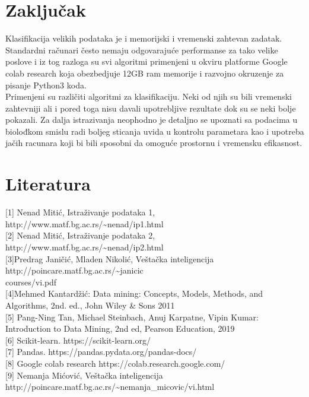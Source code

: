 \documentclass[14pt]{extarticle}
\begin{document}
\section{Zaključak}
\label{sec:naslov1}
Klasifikacija velikih podataka je i memorijski i vremenski zahtevan zadatak. Standardni računari često nemaju odgovarajuće performanse za tako velike poslove i iz tog razloga su svi algoritmi primenjeni u okviru platforme Google colab research koja obezbedjuje 12GB ram memorije i razvojno okruzenje za pisanje Python3 koda.\\ Primenjeni su različiti algoritmi za klasifikaciju. Neki od njih su bili vremenski zahtevniji ali i pored toga nisu davali upotrebljive rezultate dok su se neki bolje pokazali. Za dalja istrazivanja neophodno je detaljno se upoznati sa podacima u biolođkom smislu radi boljeg sticanja uvida u kontrolu parametara kao i upotreba jačih racunara koji bi bili  sposobni da omoguće prostornu i vremensku efikasnost. 
\section{Literatura}
\label{sec:naslov1}
[1] Nenad Mitić, Istraživanje podataka 1, http://www.matf.bg.ac.rs/\sim nenad/ip1.html \\
 
[2] Nenad Mitić, Istraživanje podataka 2, http://www.matf.bg.ac.rs/\sim nenad/ip2.html \\

[3]Predrag Janičić, Mladen Nikolić, Veštačka inteligencija http://poincare.matf.bg.ac.rs/\sim janicic\\courses/vi.pdf \\

[4]Mehmed Kantardžić: Data mining: Concepts, Models, Methods, and Algorithms, 2nd. ed., John Wiley \& Sons 2011 \\

[5] Pang-Ning Tan, Michael Steinbach, Anuj Karpatne, Vipin Kumar: Introduction to Data Mining, 2nd ed, Pearson Education, 2019 \\

[6] Scikit-learn. https://scikit-learn.org/ \\

[7] Pandas. https://pandas.pydata.org/pandas-docs/ \\

[8] Google colab research https://colab.research.google.com/ \\

[9] Nemanja Mićović, Veštačka inteligencija http://poincare.matf.bg.ac.rs/\sim nemanja_micovic/vi.html \\
\end{document}
